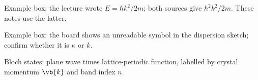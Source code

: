 \begin{discrepancy}
Example box: the lecture wrote $E=\hbar k^2/2m$; both sources give $\hbar^2k^2/2m$. These notes use the latter.
\end{discrepancy}

\begin{todobox}
Example box: the board shows an unreadable symbol in the dispersion sketch; confirm whether it is $\kappa$ or $k$.
\end{todobox}

\begin{summarybox}
Bloch states: plane wave times lattice-periodic function, labelled by crystal momentum $\vb{k}$ and band index $n$.
\end{summarybox}

